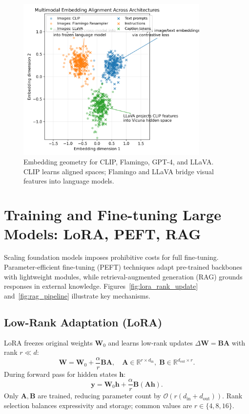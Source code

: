 \documentclass{article}
\begin{document}
\begin{figure}[H]
  \centering
  \includegraphics[width=0.85\textwidth]{clip_multimodal_alignment.png}
  \caption{Embedding geometry for CLIP, Flamingo, GPT-4, and LLaVA. CLIP learns aligned spaces; Flamingo and LLaVA bridge visual features into language models.}
  \label{fig:clip_multimodal_alignment}
\end{figure}
\FloatBarrier

\section{Training and Fine-tuning Large Models: LoRA, PEFT, RAG}
Scaling foundation models imposes prohibitive costs for full fine-tuning. Parameter-efficient fine-tuning (PEFT) techniques adapt pre-trained backbones with lightweight modules, while retrieval-augmented generation (RAG) grounds responses in external knowledge. Figures~\ref{fig:lora_rank_update} and~\ref{fig:rag_pipeline} illustrate key mechanisms.

\subsection{Low-Rank Adaptation (LoRA)}
LoRA freezes original weights $\mathbf{W}_0$ and learns low-rank updates $\Delta \mathbf{W} = \mathbf{B} \mathbf{A}$ with rank $r \ll d$:
\begin{equation}
  \mathbf{W} = \mathbf{W}_0 + \frac{\alpha}{r} \mathbf{B} \mathbf{A}, \quad \mathbf{A} \in \mathbb{R}^{r \times d_{\text{in}}}, \; \mathbf{B} \in \mathbb{R}^{d_{\text{out}} \times r}.
\end{equation}
During forward pass for hidden states $\mathbf{h}$:
\begin{equation}
  \mathbf{y} = \mathbf{W}_0 \mathbf{h} + \frac{\alpha}{r} \mathbf{B} (\mathbf{A} \mathbf{h}).
\end{equation}
Only $\mathbf{A}, \mathbf{B}$ are trained, reducing parameter count by $\mathcal{O}(r(d_{\text{in}} + d_{\text{out}}))$. Rank selection balances expressivity and storage; common values are $r \in \{4, 8, 16\}$.
\end{document}
